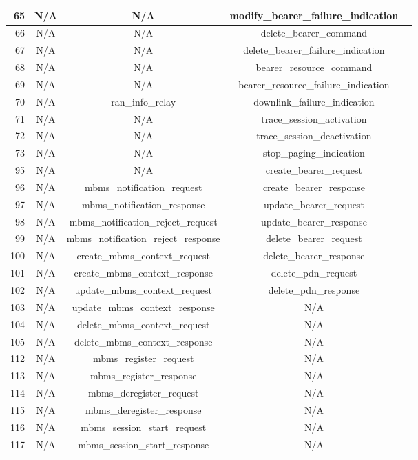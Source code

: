 \documentclass[english]{report}
\begin{document}
\begin{itemize}
\begin{longtable}{|r|c|c|c|p{13.5cm}|}
\hline
65 & N/A & N/A & modify\_bearer\_failure\_indication \\
\hline
66 & N/A & N/A & delete\_bearer\_command \\
\hline
67 & N/A & N/A & delete\_bearer\_failure\_indication \\
\hline
68 & N/A & N/A & bearer\_resource\_command \\
\hline
69 & N/A & N/A & bearer\_resource\_failure\_indication \\
\hline
70 & N/A & ran\_info\_relay & downlink\_failure\_indication \\
\hline
71 & N/A & N/A & trace\_session\_activation \\
\hline
72 & N/A & N/A & trace\_session\_deactivation \\
\hline
73 & N/A & N/A & stop\_paging\_indication \\
\hline
95 & N/A & N/A & create\_bearer\_request \\
\hline
96 & N/A & mbms\_notification\_request & create\_bearer\_response \\
\hline
97 & N/A & mbms\_notification\_response & update\_bearer\_request \\
\hline
98 & N/A & mbms\_notification\_reject\_request & update\_bearer\_response \\
\hline
99 & N/A & mbms\_notification\_reject\_response & delete\_bearer\_request \\
\hline
100 & N/A & create\_mbms\_context\_request & delete\_bearer\_response \\
\hline
101 & N/A & create\_mbms\_context\_response & delete\_pdn\_request \\
\hline
102 & N/A & update\_mbms\_context\_request & delete\_pdn\_response \\
\hline
103 & N/A & update\_mbms\_context\_response & N/A \\
\hline
104 & N/A & delete\_mbms\_context\_request & N/A \\
\hline
105 & N/A & delete\_mbms\_context\_response & N/A \\
\hline
112 & N/A & mbms\_register\_request & N/A \\
\hline
113 & N/A & mbms\_register\_response & N/A \\
\hline
114 & N/A & mbms\_deregister\_request & N/A \\
\hline
115 & N/A & mbms\_deregister\_response & N/A \\
\hline
116 & N/A & mbms\_session\_start\_request & N/A \\
\hline
117 & N/A & mbms\_session\_start\_response & N/A \\

\end{longtable}
\end{itemize}
\end{document}
